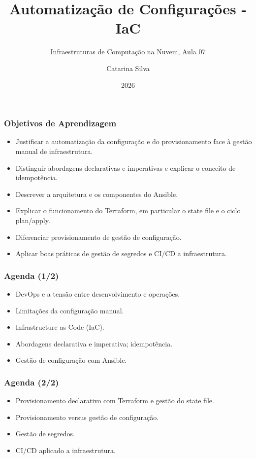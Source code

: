 \documentclass[aspectratio=169]{beamer}
\title{Automatização de Configurações - IaC}
\subtitle{Infraestruturas de Computação na Nuvem, Aula 07}
\author{Catarina Silva}
\institute{ESTGA, Universidade de Aveiro}
\date{2026}
\begin{document}
\begin{frame}[plain]
  \titlepage
\end{frame}

\begin{frame}
\frametitle{Objetivos de Aprendizagem}
\begin{itemize}
    \setlength\itemsep{0.25cm}
    \item Justificar a automatização da configuração e do provisionamento face à gestão manual de infraestrutura.
    \item Distinguir abordagens declarativas e imperativas e explicar o conceito de idempotência.
    \item Descrever a arquitetura e os componentes do Ansible.
    \item Explicar o funcionamento do Terraform, em particular o state file e o ciclo plan/apply.
    \item Diferenciar provisionamento de gestão de configuração.
    \item Aplicar boas práticas de gestão de segredos e CI/CD a infraestrutura.
\end{itemize}
\end{frame}

\begin{frame}
\frametitle{Agenda \textcolor{NudeTaupe}{\small(1/2)}}
\begin{itemize}
    \setlength\itemsep{0.4cm}
    \item DevOps e a tensão entre desenvolvimento e operações.
    \item Limitações da configuração manual.
    \item Infrastructure as Code (IaC).
    \item Abordagens declarativa e imperativa; idempotência.
    \item Gestão de configuração com Ansible.
\end{itemize}
\end{frame}

\begin{frame}
\frametitle{Agenda \textcolor{NudeTaupe}{\small(2/2)}}
\begin{itemize}
    \setlength\itemsep{0.4cm}
    \item Provisionamento declarativo com Terraform e gestão do state file.
    \item Provisionamento versus gestão de configuração.
    \item Gestão de segredos.
    \item CI/CD aplicado a infraestrutura.
\end{itemize}
\end{frame}
\end{document}
